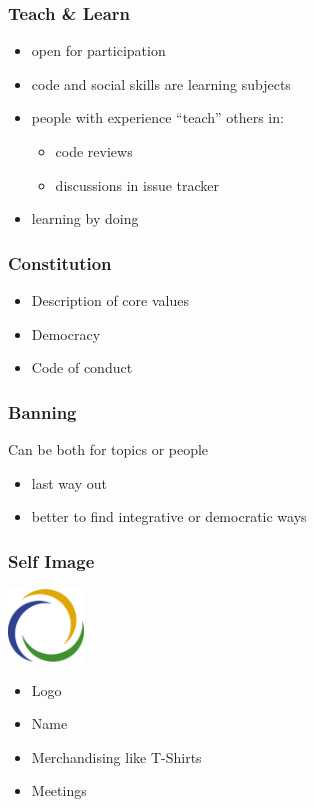 \begin{frame}
	\frametitle{Teach \& Learn}

	\begin{itemize}[<+-| alert@+>]
		\item open for participation
		\item code and social skills are learning subjects
		\item people with experience ``teach'' others in:
		\begin{itemize}[<+-| alert@+>]
			\item code reviews
			\item discussions in issue tracker
		\end{itemize}
		\item learning by doing
	\end{itemize}
\end{frame}

\begin{frame}
	\frametitle{Constitution}
	\begin{itemize}
		\item Description of core values
		\item Democracy
		\item Code of conduct
	\end{itemize}
\end{frame}

\begin{frame}
	\frametitle{Banning}

	Can be both for topics or people

	\begin{itemize}
		\item last way out
		\item better to find integrative or democratic ways
	\end{itemize}
\end{frame}

\begin{frame}
	\frametitle{Self Image}

	\hfill \includegraphics[width=2cm]{../figures/logo}
	\begin{itemize}[<+-| alert@+>]
		\item Logo
		\item Name
		\item Merchandising like T-Shirts
		\item Meetings
	\end{itemize}
\end{frame}

